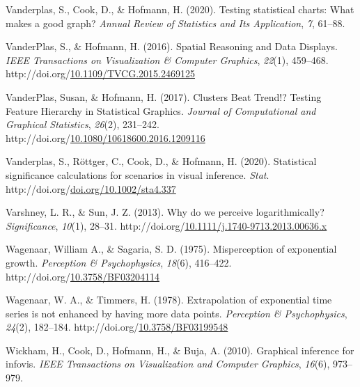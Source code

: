 \documentclass[print]{nuthesis}
\newlength{\cslhangindent}
\newenvironment{CSLReferences}%
{\setlength{\parindent}{0pt}%
\everypar{\setlength{\hangindent}{\cslhangindent}}\ignorespaces}%
{\par}
\begin{document}
\begin{CSLReferences}{1}{0}
\leavevmode\hypertarget{ref-vanderplas2020testing}{}%
Vanderplas, S., Cook, D., \& Hofmann, H. (2020). Testing statistical charts: What makes a good graph? \emph{Annual Review of Statistics and Its Application}, \emph{7}, 61--88.

\leavevmode\hypertarget{ref-vanderplasSpatialReasoningData2016}{}%
VanderPlas, S., \& Hofmann, H. (2016). Spatial {Reasoning} and {Data} {Displays}. \emph{IEEE Transactions on Visualization \& Computer Graphics}, \emph{22}(1), 459--468. http://doi.org/\href{https://doi.org/10.1109/TVCG.2015.2469125}{10.1109/TVCG.2015.2469125}

\leavevmode\hypertarget{ref-vanderplas_clusters_2017}{}%
VanderPlas, Susan, \& Hofmann, H. (2017). Clusters {Beat} {Trend}!? {Testing} {Feature} {Hierarchy} in {Statistical} {Graphics}. \emph{Journal of Computational and Graphical Statistics}, \emph{26}(2), 231--242. http://doi.org/\href{https://doi.org/10.1080/10618600.2016.1209116}{10.1080/10618600.2016.1209116}

\leavevmode\hypertarget{ref-vanderplas_statistical_nodate}{}%
Vanderplas, S., Röttger, C., Cook, D., \& Hofmann, H. (2020). Statistical significance calculations for scenarios in visual inference. \emph{Stat}. http://doi.org/\href{https://doi.org/doi.org/10.1002/sta4.337}{doi.org/10.1002/sta4.337}

\leavevmode\hypertarget{ref-varshney_why_2013}{}%
Varshney, L. R., \& Sun, J. Z. (2013). Why do we perceive logarithmically? \emph{Significance}, \emph{10}(1), 28--31. http://doi.org/\href{https://doi.org/10.1111/j.1740-9713.2013.00636.x}{10.1111/j.1740-9713.2013.00636.x}

\leavevmode\hypertarget{ref-wagenaar_misperception_1975}{}%
Wagenaar, William A., \& Sagaria, S. D. (1975). Misperception of exponential growth. \emph{Perception \& Psychophysics}, \emph{18}(6), 416--422. http://doi.org/\href{https://doi.org/10.3758/BF03204114}{10.3758/BF03204114}

\leavevmode\hypertarget{ref-wagenaar_extrapolation_1978}{}%
Wagenaar, W. A., \& Timmers, H. (1978). Extrapolation of exponential time series is not enhanced by having more data points. \emph{Perception \& Psychophysics}, \emph{24}(2), 182--184. http://doi.org/\href{https://doi.org/10.3758/BF03199548}{10.3758/BF03199548}

\leavevmode\hypertarget{ref-wickham2010graphical}{}%
Wickham, H., Cook, D., Hofmann, H., \& Buja, A. (2010). Graphical inference for infovis. \emph{IEEE Transactions on Visualization and Computer Graphics}, \emph{16}(6), 973--979.

\end{CSLReferences}
\end{document}
